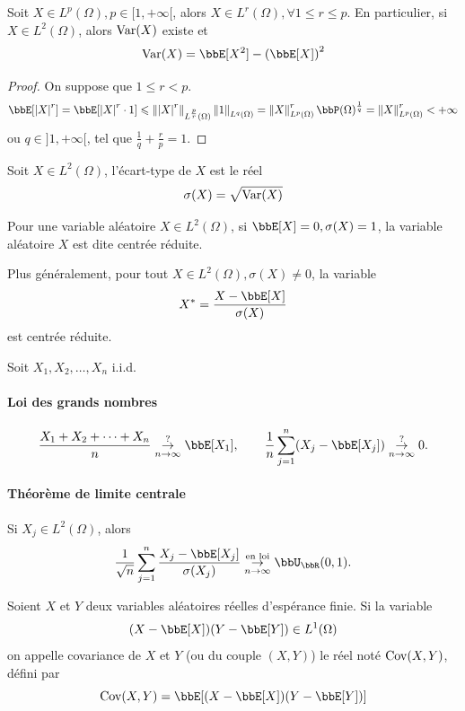 \begin{cor}
    Soit $X \in L^p(\Omega), p \in [1, +\infty[$,
    alors $X \in L^r(\Omega), \forall 1 \leqslant r \leqslant p$.
    En particulier, si $X \in L^2(\Omega)$, alors $\operatorname{Var}(X)$ existe et
    \[ \var(X) = \bbE[X^2] - \left(\bbE[X]\right)^2 \]
\end{cor}

\begin{proof}
    On suppose que $1 \leqslant r < p$.
    \[ \bbE[\lrvert{X}^r] = \bbE[\lrvert{X}^r \cdot 1] \leqslant
        \lrVert{\lrvert{X}^r}_{L^{\frac{p}{r}}(\Omega)} \lrVert{1}_{L^q(\Omega)}
        = \lrVert{X}_{L^p(\Omega)}^r \bbP(\Omega)^{\frac{1}{q}} = \lrVert{X}_{L^p(\Omega)}^r < +\infty \]
    ou $q \in ]1, +\infty[$, tel que $\frac{1}{q} + \frac{r}{p} = 1$.
\end{proof}

\begin{deff}
    Soit $X \in L^2(\Omega)$, l'écart-type de $X$ est le réel
    \[ \sigma(X) = \sqrt{\operatorname{Var}(X)} \]
\end{deff}

\begin{rqq}
    Pour une variable aléatoire $X \in L^2(\Omega)$, si $\bbE[X] = 0, \sigma(X) = 1$,
    la variable aléatoire $X$ est dite centrée réduite.

    Plus généralement, pour tout $X \in L^2(\Omega), \sigma(X) \neq 0$, la variable
    \[ X^* = \frac{X - \bbE[X]}{\sigma(X)} \]
    est centrée réduite.
\end{rqq}

Soit $X_1, X_2, \ldots, X_n$ i.i.d.

\paragraph{Loi des grands nombres}
\[ \frac{X_1 + X_2 + \cdots + X_n}{n} \overunderset{?}{n \to \infty}{\to} \bbE[X_1], \qquad
    \frac{1}{n} \sum_{j = 1}^n (X_j - \bbE[X_j]) \overunderset{?}{n \to \infty}{\to} 0. \]

\paragraph{Théorème de limite centrale}
Si $X_j \in L^2(\Omega)$, alors
\[ \frac{1}{\sqrt{n}} \sum_{j = 1}^n \frac{X_j - \bbE[X_j]}{\sigma(X_j)}
    \overunderset{\text{en loi}}{n \to \infty}{\to} \bbU_{\bbR}(0, 1). \]

\begin{deff}
    Soient $X$ et $Y$ deux variables aléatoires réelles d'espérance finie.
    Si la variable
    \[ (X - \bbE[X])(Y - \bbE[Y]) \in L^1(\Omega) \]
    on appelle covariance de $X$ et $Y$ (ou du couple $(X, Y)$)
    le réel noté $\operatorname{Cov}(X, Y)$, défini par
    \[  \cov(X, Y) = \bbE[(X - \bbE[X])(Y - \bbE[Y])] \]
\end{deff}


